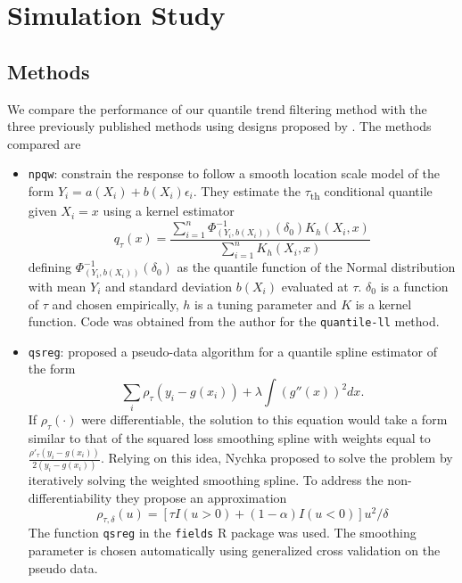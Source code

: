 \documentclass[]{article}
\begin{document}
\section{Simulation Study}

\subsection*{Methods}
We compare the performance of our quantile trend filtering method with the three previously published methods using designs proposed by \cite{Racine2017}. The methods compared are 

\begin{itemize}
	\item \texttt{npqw}: \cite{Racine2017} constrain the response to follow a smooth location scale model of the form $Y_i = a(X_i) + b(X_i)\epsilon_i$. They estimate the $\tau$\textsubscript{th} conditional quantile given $X_i = x$ using a kernel estimator
	\begin{equation}
		q_{\tau}(x) = \frac{\sum_{i=1}^n \Phi^{-1}_{(Y_i, b(X_i))}(\delta_0)K_h(X_i,x)}{\sum_{i=1}^nK_h(X_i, x)}
	\end{equation}
	defining $\Phi^{-1}_{(Y_i, b(X_i))}(\delta_0)$ as the quantile function of the Normal distribution with mean $Y_i$ and standard deviation $b(X_i)$ evaluated at $\tau$. $\delta_0$ is a function of $\tau$ and chosen empirically, $h$ is a tuning parameter and $K$ is a kernel function. Code was obtained from the author for the \texttt{quantile-ll} method. 
	
	\item \texttt{qsreg}: \cite{Oh2011} proposed a pseudo-data algorithm for a quantile spline estimator of the form 
	\begin{equation}
	\sum_i \rho_{\tau}(y_i - g(x_i)) + \lambda\int(g''(x))^2dx.
	\end{equation} 
	If $\rho_{\tau}(\cdot)$ were differentiable, the solution to this equation would take a form similar to that of the squared loss smoothing spline with weights equal to $\frac{\rho'_{\tau}(y_i-g(x_i))}{2(y_i - g(x_i))}$. Relying on this idea, Nychka proposed to solve the problem by iteratively solving the weighted smoothing spline. To address the non-differentiability they propose an approximation 
	\begin{equation}
	\rho_{\tau, \delta}(u) = [\tau I(u>0) + (1-\alpha)I(u<0)]u^2/\delta
	\end{equation}
	The function \texttt{qsreg} in the \texttt{fields} R package was used. The smoothing parameter is chosen automatically using generalized cross validation on the pseudo data.
	

\end{itemize}
\end{document}
